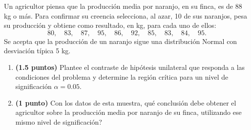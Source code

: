 
Un agricultor piensa que la producción media por naranjo, en su finca, es de 88 kg o más. Para confirmar su creencia selecciona, al azar, 10 de sus naranjos, pesa su producción y obtiene como resultado, en kg, para cada uno de ellos:
\[
80,\quad83,\quad87,\quad95,\quad86,\quad92,\quad85,\quad83,\quad84,\quad95.
\]
Se acepta que la producción de un naranjo sigue una distribución Normal con desviación típica 5 kg.
\begin{enumerate}[label=\alph*)]
\item \textbf{(1.5 puntos)} Plantee el contraste de hipótesis unilateral que responda a las condiciones del problema y determine la región crítica para un nivel de significación $\alpha=0.05$.
\item \textbf{(1 punto)} Con los datos de esta muestra, \textquestiondown{}qué conclusión debe obtener el agricultor sobre la producción media por naranjo de su finca, utilizando ese mismo nivel de significación?
\end{enumerate}
